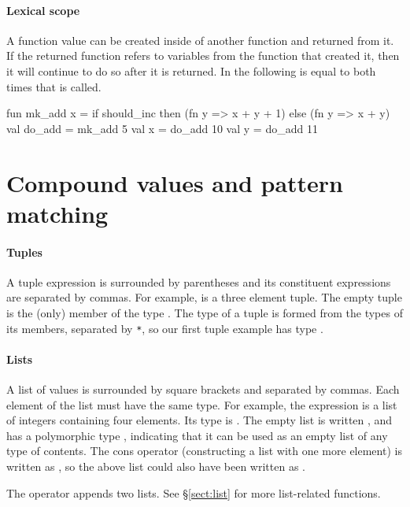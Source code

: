 \documentclass[12pt,a4paper]{book}
\begin{document}
\paragraph{Lexical scope}
A function value can be created inside of another function and returned from
it. If the returned function refers to variables from the function that created
it, then it will continue to do so after it is returned. In the following  is equal to  both times that  is called.
\begin{smlcode}
fun mk_add x =
  if should_inc then (fn y => x + y + 1)
  else (fn y => x + y)
val do_add = mk_add 5
val x = do_add 10
val y = do_add 11
\end{smlcode}

\section{Compound values and pattern matching}
\label{sect:compound}

\paragraph{Tuples} A tuple expression is surrounded by parentheses and its constituent expressions are separated by commas. For example,  is a three element tuple. The empty tuple \smlinline{()} is the (only) member of the type . The type of a tuple is formed from the types of its members, separated by \texttt{*}, so our first tuple example has type .

\paragraph{Lists} A list of values is surrounded by square brackets and separated by commas. Each element of the list must have the same type. For example, the expression \smlinline{[1, 2+3, 0, 4]} is a list of integers containing four elements. Its type is . The empty list is written \smlinline{[]}, and has a polymorphic type , indicating that it can be used as an empty list of any type of contents. The cons operator (constructing a list with one more element) is written as \smlinline{::}, so the above list could also have been written as .

The  operator appends two lists. See \S\ref{sect:list} for more list-related functions.
\end{document}
